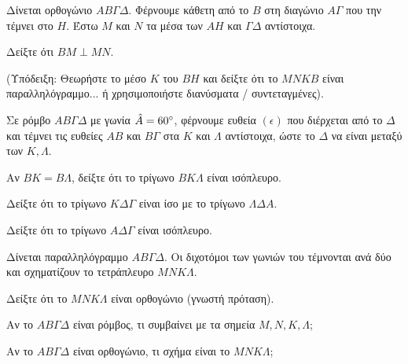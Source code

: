\documentclass[11pt,a4paper,modern]{FFExercises}
\begin{document}
\askhsh
Δίνεται ορθογώνιο $ΑΒ\varGamma\Delta$. Φέρνουμε κάθετη από το $B$ στη διαγώνιο $A\varGamma$ που την τέμνει στο $H$. Έστω $M$ και $N$ τα μέσα των $AH$ και $\varGamma\Delta$ αντίστοιχα.
\begin{alist}
    \item Δείξτε ότι $BM \perp MN$.
    \item (Υπόδειξη: Θεωρήστε το μέσο $K$ του $BH$ και δείξτε ότι το $MNKB$ είναι παραλληλόγραμμο... ή χρησιμοποιήστε διανύσματα / συντεταγμένες).
\end{alist}

\askhsh
Σε ρόμβο $ΑΒ\varGamma\Delta$ με γωνία $\hat{A} = 60\degree$, φέρνουμε ευθεία $(\epsilon)$ που διέρχεται από το $\Delta$ και τέμνει τις ευθείες $AB$ και $B\varGamma$ στα $K$ και $\Lambda$ αντίστοιχα, ώστε το $\Delta$ να είναι μεταξύ των $K, \Lambda$.
\begin{alist}
    \item Αν $BK = B\Lambda$, δείξτε ότι το τρίγωνο $BK\Lambda$ είναι ισόπλευρο.
    \item Δείξτε ότι το τρίγωνο $K\Delta\varGamma$ είναι ίσο με το τρίγωνο $\Lambda\Delta A$.
    \item Δείξτε ότι το τρίγωνο $A\Delta\varGamma$ είναι ισόπλευρο.
\end{alist}

\askhsh
Δίνεται παραλληλόγραμμο $ΑΒ\varGamma\Delta$. Οι διχοτόμοι των γωνιών του τέμνονται ανά δύο και σχηματίζουν το τετράπλευρο $MNK\Lambda$.
\begin{alist}
    \item Δείξτε ότι το $MNK\Lambda$ είναι ορθογώνιο (γνωστή πρόταση).
    \item Αν το $ΑΒ\varGamma\Delta$ είναι ρόμβος, τι συμβαίνει με τα σημεία $M, N, K, \Lambda$;
    \item Αν το $ΑΒ\varGamma\Delta$ είναι ορθογώνιο, τι σχήμα είναι το $MNK\Lambda$;
\end{alist}
\end{document}
